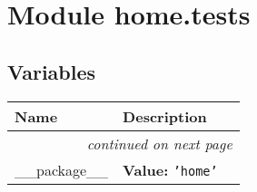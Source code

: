 %
%
%


\section{Module home.tests}

    \label{home:tests}


  \subsection{Variables}

    \vspace{-1cm}
\hspace{\varindent}\begin{longtable}{|p{\varnamewidth}|p{\vardescrwidth}|l}
\cline{1-2}
\cline{1-2} \centering \textbf{Name} & \centering \textbf{Description}& \\
\cline{1-2}
\endhead\cline{1-2}\multicolumn{3}{r}{\small\textit{continued on next page}}\\\endfoot\cline{1-2}
\endlastfoot\raggedright \_\-\_\-p\-a\-c\-k\-a\-g\-e\-\_\-\_\- & \raggedright \textbf{Value:} 
{\tt \texttt{'}\texttt{home}\texttt{'}}&\\
\cline{1-2}
\end{longtable}

